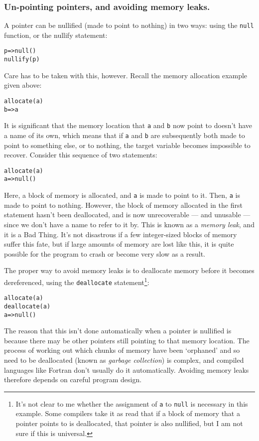 \subsubsection{Un-pointing pointers, and avoiding memory leaks.}
%
A pointer can be nullified (made to point to nothing) in two ways: using the
\texttt{null} function, or the nullify statement:
%
\begin{alltt}
    p => null()
    nullify(p)
\end{alltt}
%
Care has to be taken with this, however. Recall the memory allocation example given above:
%
\begin{alltt}
    allocate(a)
    b => a
\end{alltt}
%
It is significant that the memory location that \texttt{a} and \texttt{b} now point to
doesn't have a name of its own, which means that if \texttt{a} and \texttt{b}
are subsequently both made to point to something else, or to nothing, the
target variable becomes impossible to recover. Consider this sequence of
two statements:
%
\begin{alltt}
    allocate(a)
    a => null()
\end{alltt}
%
Here, a block of memory is allocated, and \texttt{a} is made to point to
it. Then, \texttt{a} is made to point to nothing. However, the block of memory
allocated in the first statement hasn't been deallocated, and is now
unrecoverable --- and unusable --- since we don't have a name to refer to it by.
This is known as a \emph{memory leak}, and it is a Bad Thing. It's not
disastrous if a few integer-sized blocks of memory suffer this fate, but if
large amounts of memory are lost like this, it is quite possible for the
program to crash or become very slow as a result.

The proper way to avoid memory leaks is to deallocate memory before it becomes
dereferenced, using the \texttt{deallocate} statement\footnote{It's not clear
  to me whether the assignment of \texttt{a} to \texttt{null} is necessary in
  this example. Some compilers take it as read that if a block of memory that
  a pointer points to is deallocated, that pointer is also nullified, but I am
not sure if this is universal.}:
%
\begin{alltt}
    allocate(a)
    deallocate(a)
    a => null()
\end{alltt}
%
 The reason that this isn't done automatically when a pointer is nullified is because there may be
other pointers still pointing to that memory location. The process of working
out which chunks of memory have been `orphaned' and so need to be deallocated
(known as \emph{garbage collection}) is complex, and compiled languages like
Fortran don't usually do it automatically. Avoiding memory leaks therefore
depends on careful program design.
%
